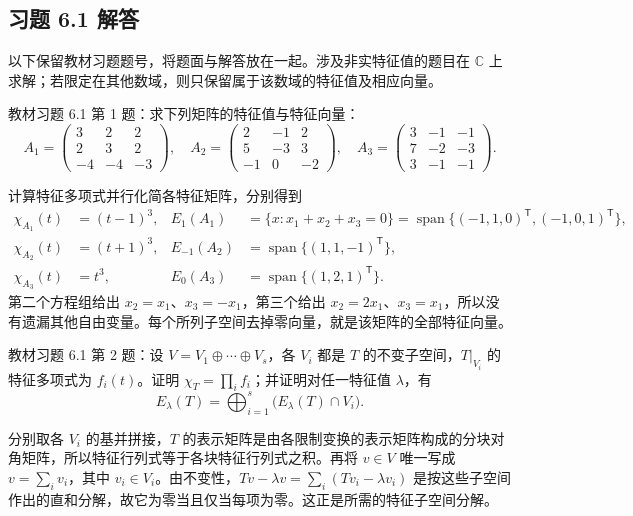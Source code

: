 \subsection{习题 6.1 解答}
\label{subsec:xie-exercises-61}

以下保留教材习题题号，将题面与解答放在一起。涉及非实特征值的题目在 $\mathbb C$ 上求解；若限定在其他数域，则只保留属于该数域的特征值及相应向量。

\begin{example}
\label{ex:xie-61-01}
教材习题 6.1 第 1 题：求下列矩阵的特征值与特征向量：
\[
 A_1=\begin{pmatrix}3&2&2\\2&3&2\\-4&-4&-3\end{pmatrix},\quad
 A_2=\begin{pmatrix}2&-1&2\\5&-3&3\\-1&0&-2\end{pmatrix},\quad
 A_3=\begin{pmatrix}3&-1&-1\\7&-2&-3\\3&-1&-1\end{pmatrix}.
\]
\end{example}
\begin{solve}
计算特征多项式并行化简各特征矩阵，分别得到
\[
 \begin{aligned}
 \chi_{A_1}(t)&=(t-1)^3,& E_1(A_1)&=\{x:x_1+x_2+x_3=0\}
 =\operatorname{span}\{(-1,1,0)^{\mathsf T},(-1,0,1)^{\mathsf T}\},\\
 \chi_{A_2}(t)&=(t+1)^3,& E_{-1}(A_2)&=\operatorname{span}\{(1,1,-1)^{\mathsf T}\},\\
 \chi_{A_3}(t)&=t^3,& E_0(A_3)&=\operatorname{span}\{(1,2,1)^{\mathsf T}\}.
 \end{aligned}
\]
第二个方程组给出 $x_2=x_1$、$x_3=-x_1$，第三个给出 $x_2=2x_1$、$x_3=x_1$，所以没有遗漏其他自由变量。每个所列子空间去掉零向量，就是该矩阵的全部特征向量。
\end{solve}

\begin{example}
\label{ex:xie-61-02}
教材习题 6.1 第 2 题：设 $V=V_1\oplus\cdots\oplus V_s$，各 $V_i$ 都是 $T$ 的不变子空间，$T|_{V_i}$ 的特征多项式为 $f_i(t)$。证明 $\chi_T=\prod_i f_i$；并证明对任一特征值 $\lambda$，有
\[
 E_\lambda(T)=\bigoplus_{i=1}^s\bigl(E_\lambda(T)\cap V_i\bigr).
\]
\end{example}
\begin{solve}
分别取各 $V_i$ 的基并拼接，$T$ 的表示矩阵是由各限制变换的表示矩阵构成的分块对角矩阵，所以特征行列式等于各块特征行列式之积。再将 $v\in V$ 唯一写成 $v=\sum_i v_i$，其中 $v_i\in V_i$。由不变性，$Tv-\lambda v=\sum_i(Tv_i-\lambda v_i)$ 是按这些子空间作出的直和分解，故它为零当且仅当每项为零。这正是所需的特征子空间分解。
\end{solve}

